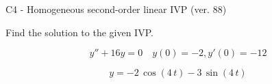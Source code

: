 \begin{exercise}
  \begin{exerciseTitle}C4 - Homogeneous second-order linear IVP (ver. 88)\end{exerciseTitle}
  \begin{exerciseStatement}
    
Find the solution to the given IVP.

    
\[y''+16y = 0 \hspace{1em} y(0) = -2 , y'(0) = -12\]

  \end{exerciseStatement}
  \begin{exerciseAnswer}
    
\[y= -2 \, \cos\left(4 \, t\right) - 3 \, \sin\left(4 \, t\right)\]

  \end{exerciseAnswer}
\end{exercise}